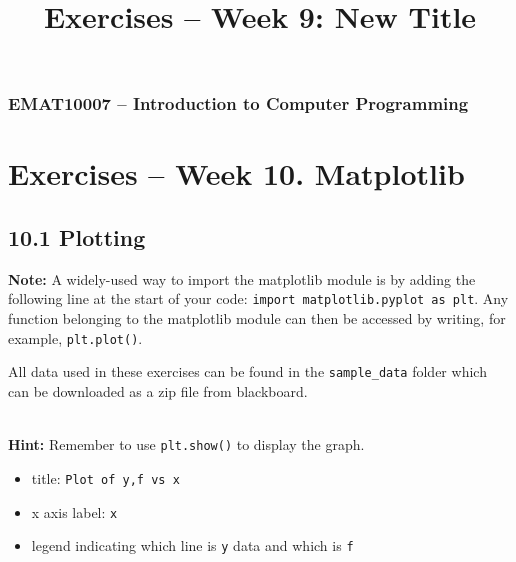 \documentclass[11pt]{report}
\begin{document}
\title{Exercises -- Week 9: New Title}
\subsubsection*{EMAT10007 -- Introduction to Computer Programming}
\section*{\Large Exercises -- Week 10. Matplotlib}

\subsection*{\Large 10.1 Plotting}

\textbf{Note:} A widely-used way to import the matplotlib module is by adding the following line at the start of your code: {\tt import matplotlib.pyplot as plt}. Any function belonging to the  matplotlib module can then be accessed by writing, for example, {\tt plt.plot()}.

All data used in these exercises can be found in the {\tt sample\_data} folder which can be downloaded as a zip file from blackboard. 


\begin{Exercise}[title= Line and scatter graphs (Essential)] 
\label{Ex:Variables}
	\\
	\textbf {Hint:}	Remember to use {\tt plt.show()} to display the graph.

	
    
	\begin{itemize}
	    \item title: {\tt Plot of y,f vs x}
	    \item x axis label: {\tt x}
	    \item legend indicating which line is {\tt y} data and which is {\tt f}
	  \end{itemize}
	  

\end{Exercise}
\end{document}
